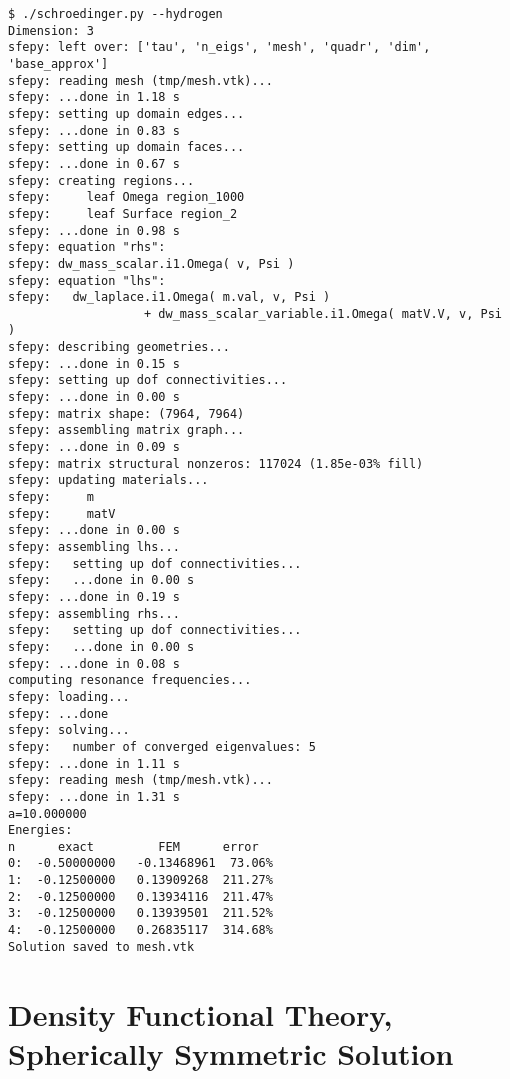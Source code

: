 \begin{lstlisting}
$ ./schroedinger.py --hydrogen
Dimension: 3
sfepy: left over: ['tau', 'n_eigs', 'mesh', 'quadr', 'dim', 'base_approx']
sfepy: reading mesh (tmp/mesh.vtk)...
sfepy: ...done in 1.18 s
sfepy: setting up domain edges...
sfepy: ...done in 0.83 s
sfepy: setting up domain faces...
sfepy: ...done in 0.67 s
sfepy: creating regions...
sfepy:     leaf Omega region_1000
sfepy:     leaf Surface region_2
sfepy: ...done in 0.98 s
sfepy: equation "rhs":
sfepy: dw_mass_scalar.i1.Omega( v, Psi )
sfepy: equation "lhs":
sfepy:   dw_laplace.i1.Omega( m.val, v, Psi )
                   + dw_mass_scalar_variable.i1.Omega( matV.V, v, Psi )
sfepy: describing geometries...
sfepy: ...done in 0.15 s
sfepy: setting up dof connectivities...
sfepy: ...done in 0.00 s
sfepy: matrix shape: (7964, 7964)
sfepy: assembling matrix graph...
sfepy: ...done in 0.09 s
sfepy: matrix structural nonzeros: 117024 (1.85e-03% fill)
sfepy: updating materials...
sfepy:     m
sfepy:     matV
sfepy: ...done in 0.00 s
sfepy: assembling lhs...
sfepy:   setting up dof connectivities...
sfepy:   ...done in 0.00 s
sfepy: ...done in 0.19 s
sfepy: assembling rhs...
sfepy:   setting up dof connectivities...
sfepy:   ...done in 0.00 s
sfepy: ...done in 0.08 s
computing resonance frequencies...
sfepy: loading...
sfepy: ...done
sfepy: solving...
sfepy:   number of converged eigenvalues: 5
sfepy: ...done in 1.11 s
sfepy: reading mesh (tmp/mesh.vtk)...
sfepy: ...done in 1.31 s
a=10.000000
Energies:
n      exact         FEM      error
0:  -0.50000000   -0.13468961  73.06%
1:  -0.12500000   0.13909268  211.27%
2:  -0.12500000   0.13934116  211.47%
3:  -0.12500000   0.13939501  211.52%
4:  -0.12500000   0.26835117  314.68%
Solution saved to mesh.vtk
\end{lstlisting}

\section{Density Functional Theory, Spherically Symmetric Solution}
